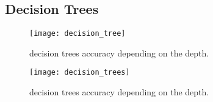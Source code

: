 
\subsection{Decision Trees}%
\label{sub:decision-trees}
\begin{figure}[H]
    \centering
    \texttt{[image: decision\_tree]}
    \caption{decision trees accuracy depending on the depth.}%
    \label{fig:knn_pca_lda_nca}
\end{figure}
\begin{figure}[H]
    \centering
    \texttt{[image: decision\_trees]}
    \caption{decision trees accuracy depending on the depth.}%
    \label{fig:knn_pca_lda_nca}
\end{figure}

